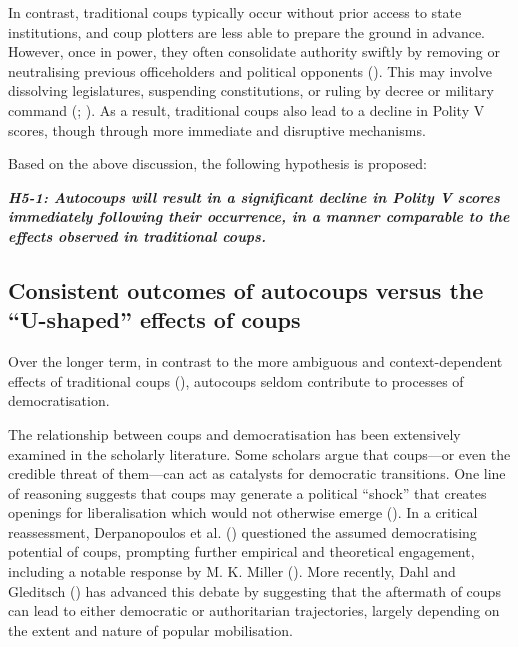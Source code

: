 \documentclass[
  12pt,
]{report}
\begin{document}
In contrast, traditional coups typically occur without prior access to
state institutions, and coup plotters are less able to prepare the
ground in advance. However, once in power, they often consolidate
authority swiftly by removing or neutralising previous officeholders and
political opponents (). This
may involve dissolving legislatures, suspending constitutions, or ruling
by decree or military command
(;
). As a result, traditional
coups also lead to a decline in Polity V scores, though through more
immediate and disruptive mechanisms.

Based on the above discussion, the following hypothesis is proposed:

\textbf{\emph{H5-1: Autocoups will result in a significant decline in
Polity V scores immediately following their occurrence, in a manner
comparable to the effects observed in traditional coups.}}

\subsection*{Consistent outcomes of autocoups versus the ``U-shaped''
effects of
coups}\label{consistent-outcomes-of-autocoups-versus-the-u-shaped-effects-of-coups}

Over the longer term, in contrast to the more ambiguous and
context-dependent effects of traditional coups
(), autocoups seldom
contribute to processes of democratisation.

The relationship between coups and democratisation has been extensively
examined in the scholarly literature. Some scholars argue that
coups---or even the credible threat of them---can act as catalysts for
democratic transitions. One line of reasoning suggests that coups may
generate a political ``shock'' that creates openings for liberalisation
which would not otherwise emerge (). In a critical reassessment, Derpanopoulos et al.
() questioned the assumed
democratising potential of coups, prompting further empirical and
theoretical engagement, including a notable response by M. K. Miller
(). More recently, Dahl and Gleditsch
() has advanced this debate by suggesting
that the aftermath of coups can lead to either democratic or
authoritarian trajectories, largely depending on the extent and nature
of popular mobilisation.
\end{document}
